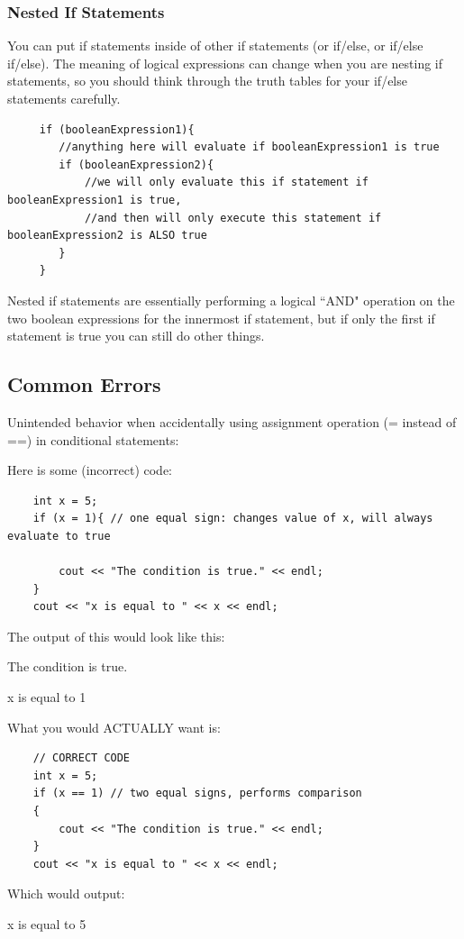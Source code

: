  \subsubsection{Nested If Statements}
 You can put if statements inside of other if statements (or if/else, or if/else if/else). The meaning of logical expressions can change when you are nesting if statements, so you should think through the truth tables for your if/else statements carefully. 

 \begin{verbatim}
     if (booleanExpression1){
        //anything here will evaluate if booleanExpression1 is true
        if (booleanExpression2){
            //we will only evaluate this if statement if booleanExpression1 is true, 
            //and then will only execute this statement if booleanExpression2 is ALSO true
        }
     }
 \end{verbatim}

 Nested if statements are essentially performing a logical ``AND" operation on the two boolean expressions for the innermost if statement, but if only the first if statement is true you can still do other things. 

\subsection{Common Errors}
Unintended behavior when accidentally using assignment operation (= instead of ==) in conditional statements:

\begin{example}
    Here is some (incorrect) code:

    \begin{verbatim}
    int x = 5;
    if (x = 1){ // one equal sign: changes value of x, will always evaluate to true
    
        cout << "The condition is true." << endl;
    }
    cout << "x is equal to " << x << endl;
    \end{verbatim}
    The output of this would look like this:
    \begin{sample}
The condition is true.

x is equal to 1
    \end{sample}
    What you would ACTUALLY want is:
    \begin{verbatim}
    // CORRECT CODE
    int x = 5;
    if (x == 1) // two equal signs, performs comparison
    {
        cout << "The condition is true." << endl;
    }
    cout << "x is equal to " << x << endl;
    \end{verbatim}
    Which would output:
    \begin{sample}
x is equal to 5
    \end{sample}
\end{example}

